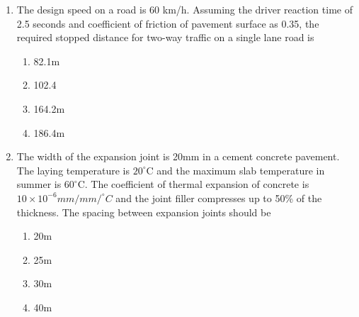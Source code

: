\documentclass[journal]{IEEEtran}
\begin{document}
\begin{enumerate}
{            \begin{multicols}{4}
                \begin{enumerate}
                	\item 4.4\%
                	\item 4.75\%
                	\item 5.0\%
                	\item 5.25\%
                \end{enumerate}
            \end{multicols}
        
        }
    \item{
            The design speed on a road is 60 km/h. Assuming the driver reaction time of 2.5 seconds and coefficient of friction of pavement surface as 0.35, the required stopped distance for two-way traffic on a single lane road is 
             \hfill
                
			\begin{multicols}{4}
				\begin{enumerate}
					\item 82.1m
					\item 102.4
					\item 164.2m
					\item 186.4m
				\end{enumerate}
			\end{multicols}
        
        }
    \item{
        
           	The width of the expansion joint is 20mm in a cement concrete pavement. The laying temperature is $20^{\circ}$C and the maximum slab temperature in summer is $60^{\circ}$C. The coefficient of thermal expansion of concrete is $10 \times 10^{-6} mm/mm/^{\circ}C$ and the joint filler compresses up to 50\% of the thickness. The spacing between expansion joints should be
             \text{   }\hfill
                
            \begin{multicols}{4}
                \begin{enumerate}
                	\item 20m
                	\item 25m
                	\item 30m
                	\item 40m
                \end{enumerate}
            \end{multicols}
        
}
\end{enumerate}
\end{document}
